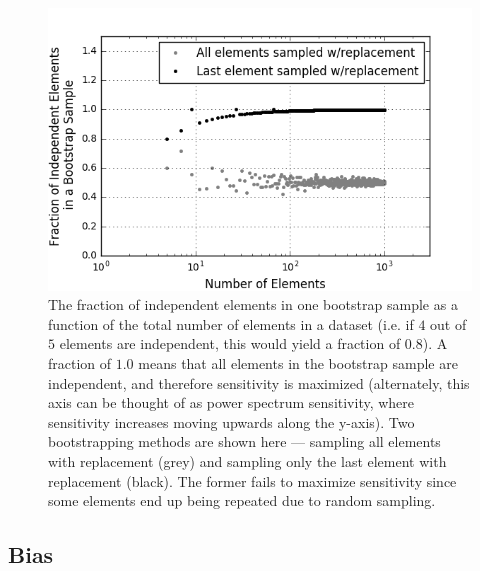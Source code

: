 \documentclass[preprint2,numberedappendix,tighten]{aastex6}  %
\begin{document}
\begin{figure}
	\centering
	\includegraphics[trim={0.3cm 0.3cm 0.3cm 0.3cm},width=\columnwidth]{plots/toy_error2.png}
	\caption{The fraction of independent elements in one bootstrap sample as a function of the total number of elements in a dataset (i.e. if $4$ out of $5$ elements are independent, this would yield a fraction of $0.8$). A fraction of $1.0$ means that all elements in the bootstrap sample are independent, and therefore sensitivity is maximized (alternately, this axis can be thought of as power spectrum sensitivity, where sensitivity increases moving upwards along the y-axis). Two bootstrapping methods are shown here --- sampling all elements with replacement (grey) and sampling only the last element with replacement (black). The former fails to maximize sensitivity since some elements end up being repeated due to random sampling.} %
	\label{fig:toy_error2}
\end{figure}


\subsection{Bias}
\label{sec:BiasOverview}
\end{document}
